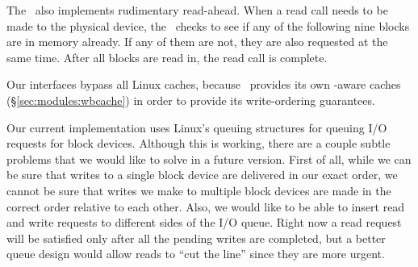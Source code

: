 The \module\ also implements rudimentary read-ahead. When a read call needs to
be made to the physical device, the \module\ checks to see if any of the
following nine blocks are in memory already. If any of them are not, they are
also requested at the same time. After all blocks are read in, the read call is
complete.

Our interfaces bypass all Linux caches, because \Kudos\ provides its own
\chdesc-aware caches (\S\ref{sec:modules:wbcache}) in order to provide its
write-ordering guarantees.

Our current implementation uses Linux's queuing structures for
queuing I/O requests for block devices. Although this is working, there are a
couple subtle problems that we would like to solve in a future version. First of
all, while we can be sure that writes to a single block device are delivered in
our exact order, we cannot be sure that writes we make to multiple block devices
are made in the correct order relative to each other. Also, we would like to be
able to insert read and write requests to different sides of the I/O queue.
Right now a read request will be satisfied only after all the pending writes
are completed, but a better queue design would allow reads to ``cut the line''
since they are more urgent.
